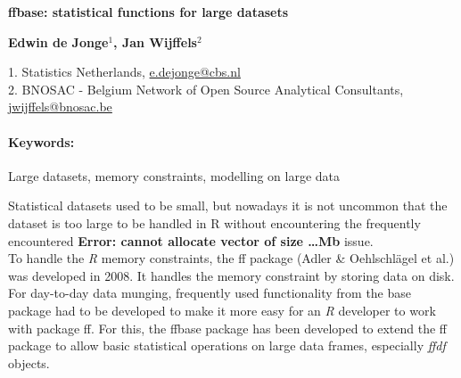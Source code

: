 \documentclass[11pt, a4paper]{article}
\newcommand{\pkg}[1]{{\normalfont\fontseries{b}\selectfont #1}}
\let\proglang=\textit
\renewcommand{\title}[1]{\begin{center}{\bf \LARGE #1}\end{center}}
\newcommand{\keywords}{\paragraph{Keywords:}}
\begin{document}
\pagestyle{empty}

\title{\pkg{ffbase}: statistical functions for large datasets}

\begin{center}
  {\bf Edwin de Jonge$^{1}$, Jan Wijffels$^{2}$}
\end{center}

\begin{affiliations}
1. Statistics Netherlands,  \href{mailto:e.dejonge@cbs.nl}{e.dejonge@cbs.nl} \\[-2pt]
2. BNOSAC - Belgium Network of Open Source Analytical Consultants,  \href{mailto:jwijffels@bnosac.be}{jwijffels@bnosac.be} \\[-2pt]
\end{affiliations}

\keywords Large datasets, memory constraints, modelling on large data

\vskip 0.8cm
Statistical datasets used to be small, but nowadays it is not uncommon that the dataset is too large to be handled in R without encountering the frequently encountered \textbf{Error: cannot allocate vector of size \ldots Mb} issue.\\

To handle the \proglang{R} memory constraints, the \pkg{ff} package (Adler \& Oehlschl\"{a}gel et al.) was developed in 2008. It handles the memory constraint by storing data on disk.
For day-to-day data munging, frequently used functionality from the \pkg{base} package had to be developed to make it more easy for an \proglang{R} developer to work with package \pkg{ff}. For this, the \pkg{ffbase} package has been developed to extend the \pkg{ff} package to allow basic statistical operations on large data frames, especially \emph{ffdf} objects.\\
\end{document}
